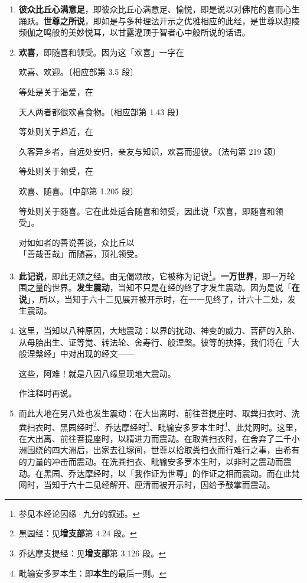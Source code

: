 \begin{enumerate}\item \textbf{彼众比丘心满意足}，即彼众比丘心满意足、愉悦，即是说以对佛陀的喜而心生踊跃。\textbf{世尊之所说}，即如是与多种理法开示之优雅相应的此经，是世尊以迦陵频伽之鸣般的美妙悦耳，以甘露灌顶于智者心中般所说的话语。
\item \textbf{欢喜}，即随喜和领受。因为这「欢喜」一字在\begin{quoting}欢喜、欢迎。{\bluefootnotesize 〔相应部第 3.5 段〕}\end{quoting}等处是关于渴爱，在\begin{quoting}天人两者都很欢喜食物。{\bluefootnotesize 〔相应部第 1.43 段〕}\end{quoting}等处则关于趋近，在\begin{quoting}久客异乡者，自远处安归，亲友与知识，欢喜而迎彼。{\bluefootnotesize 〔法句第 219 颂〕}\end{quoting}等处则关于领受，在\begin{quoting}欢喜、随喜。{\bluefootnotesize 〔中部第 1.205 段〕}\end{quoting}等处则关于随喜。它在此处适合随喜和领受，因此说「欢喜，即随喜和领受」。\begin{quoting}对如如者的善说善谈，众比丘以\\「善哉善哉」而随喜，顶礼领受。\end{quoting}
\item \textbf{此记说}，即此无颂之经。由无偈颂故，它被称为记说\footnote{参见本经论因缘·九分的叙述。}。\textbf{一万世界}，即一万轮围之量的世界。\textbf{发生震动}，当知不只是在经的终了才发生震动。因为是说「\textbf{在说}」，所以，当知于六十二见展开被开示时，在一一见终了，计六十二处，发生震动。
\item 这里，当知以八种原因，大地震动：以界的扰动、神变的威力、菩萨的入胎、从母胎出生、证等觉、转法轮、舍寿行、般涅槃。彼等的抉择，我们将在「大般涅槃经」中对出现的经文——\begin{quoting}这些，阿难！就是八因八缘显现地大震动。\end{quoting}作注释时再说。
\item 而此大地在另八处也发生震动：在大出离时、前往菩提座时、取粪扫衣时、洗粪扫衣时、黑园经时\footnote{黑园经：见\textbf{增支部}第 4.24 段。}、乔达摩经时\footnote{乔达摩支提经：见\textbf{增支部}第 3.126 段。}、毗输安多罗本生时\footnote{毗输安多罗本生：即\textbf{本生}的最后一则。}、此梵网时。这里，在大出离、前往菩提座时，以精进力而震动。在取粪扫衣时，在舍弃了二千小洲围绕的四大洲后，出家去往塚间，世尊以拾取粪扫衣而行难行之事，由希有的力量的冲击而震动。在洗粪扫衣、毗输安多罗本生时，以非时之震动而震动。在黑园、乔达摩经时，以「我作证为世尊」的作证之相而震动。而在此梵网时，当知于六十二见经解开、厘清而被开示时，因给予鼓掌而震动。

\end{enumerate}
